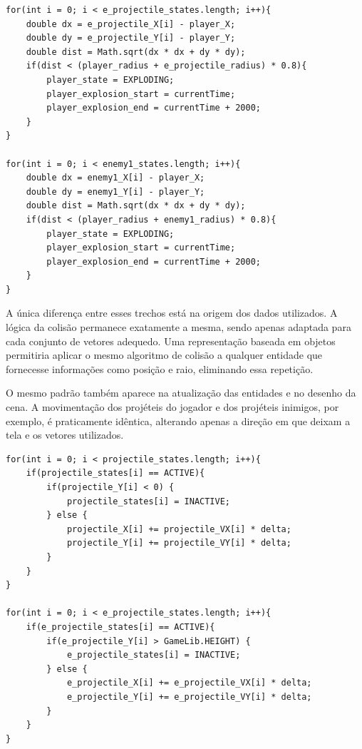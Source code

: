 \begin{lstlisting}[caption={Exemplos de laços de colisão presentes no código original (Main.java)}]
for(int i = 0; i < e_projectile_states.length; i++){
    double dx = e_projectile_X[i] - player_X;
    double dy = e_projectile_Y[i] - player_Y;
    double dist = Math.sqrt(dx * dx + dy * dy);
    if(dist < (player_radius + e_projectile_radius) * 0.8){
        player_state = EXPLODING;
        player_explosion_start = currentTime;
        player_explosion_end = currentTime + 2000;
    }
}

for(int i = 0; i < enemy1_states.length; i++){
    double dx = enemy1_X[i] - player_X;
    double dy = enemy1_Y[i] - player_Y;
    double dist = Math.sqrt(dx * dx + dy * dy);
    if(dist < (player_radius + enemy1_radius) * 0.8){
        player_state = EXPLODING;
        player_explosion_start = currentTime;
        player_explosion_end = currentTime + 2000;
    }
}
\end{lstlisting}

A única diferença entre esses trechos está na origem dos dados utilizados. A
lógica da colisão permanece exatamente a mesma, sendo apenas adaptada para cada
conjunto de vetores adequedo. Uma representação baseada em objetos permitiria aplicar o
mesmo algoritmo de colisão a qualquer entidade que fornecesse informações como
posição e raio, eliminando essa repetição.

O mesmo padrão também aparece na atualização das entidades e no desenho da
cena. A movimentação dos projéteis do jogador e dos projéteis inimigos, por
exemplo, é praticamente idêntica, alterando apenas a direção em que deixam a
tela e os vetores utilizados.

\begin{lstlisting}[caption={Atualização dos projéteis do jogador e dos projéteis inimigos (Main.java)}]
for(int i = 0; i < projectile_states.length; i++){
    if(projectile_states[i] == ACTIVE){
        if(projectile_Y[i] < 0) {
            projectile_states[i] = INACTIVE;
        } else {
            projectile_X[i] += projectile_VX[i] * delta;
            projectile_Y[i] += projectile_VY[i] * delta;
        }
    }
}

for(int i = 0; i < e_projectile_states.length; i++){
    if(e_projectile_states[i] == ACTIVE){
        if(e_projectile_Y[i] > GameLib.HEIGHT) {
            e_projectile_states[i] = INACTIVE;
        } else {
            e_projectile_X[i] += e_projectile_VX[i] * delta;
            e_projectile_Y[i] += e_projectile_VY[i] * delta;
        }
    }
}
\end{lstlisting}

